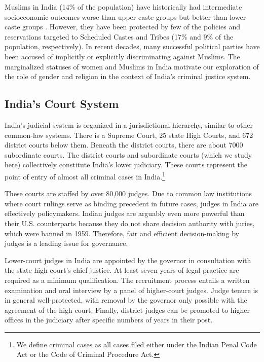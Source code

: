 \documentclass[12pt,english]{article}
\begin{document}
Muslims in India (14\% of the population) have historically had intermediate socioeconomic outcomes worse than upper caste groups but better than lower caste groups \citep{sachar2006}. However, they have been protected by few of the policies and reservations targeted to Scheduled Castes and Tribes (17\% and 9\% of the population, respectively). In recent decades, many successful political parties have been accused of implicitly or explicitly discriminating against Muslims. The marginalized statuses of  women and Muslims in India motivate our exploration of the role of gender and religion in the context of India's criminal justice system.

\subsection{India's Court System}

India's judicial system is organized in a jurisdictional hierarchy, similar to other common-law systems. There is a Supreme Court, 25 state High Courts, and 672 district courts below them. Beneath the district courts, there are about 7000 subordinate courts. The district courts and subordinate courts (which we study here) collectively constitute India's lower judiciary. These courts represent the point of entry of almost all criminal cases in India.\footnote{We define criminal cases as all cases filed either under the Indian Penal Code Act or the Code of Criminal Procedure Act.}

These courts are staffed by over 80,000 judges. Due to common law institutions where court rulings serve as binding precedent in future cases, judges in India are effectively policymakers. Indian judges are arguably even more powerful than their U.S. counterparts because they do not share decision authority with juries, which were banned in 1959. Therefore, fair and efficient decision-making by judges is a leading issue for governance. 

Lower-court judges in India are appointed by the governor in consultation with the state high court's chief justice. At least seven years of legal practice are required as a  minimum qualification. The recruitment process entails a written examination and oral interview by a panel of higher-court judges. Judge tenure is in general well-protected, with removal by the governor only possible with the agreement of the high court. Finally,  district judges can be promoted to higher offices in the judiciary after specific numbers of years in their post.
\end{document}
